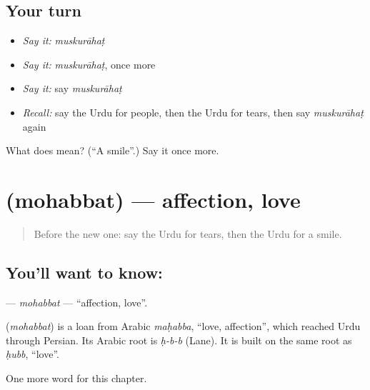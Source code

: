 \subsection*{Your turn}
\begin{itemize}
\raggedright
  \item \emph{Say it:} \emph{muskurāhaṭ}
  \item \emph{Say it:} \emph{muskurāhaṭ}, once more
  \item \emph{Say it:} say \emph{muskurāhaṭ}
  \item \emph{Recall:} say the Urdu for people, then the Urdu for tears, then say \emph{muskurāhaṭ} again
\end{itemize}

\begin{tcolorbox}[breakable,colback=teal!4,colframe=teal!35!black,title={Before you move on}]
What does  mean? (\textquotedblleft{}A smile\textquotedblright{}.) Say it once more.
\end{tcolorbox}
\section[\texorpdfstring{\ur{محبت} (mohabbat)}{محبت (mohabbat)}]{ (mohabbat) — affection, love}

\label{lesson:UR-C257-mohabbat}



\begin{quote}
Before the new one: say the Urdu for tears, then the Urdu for a smile.
\end{quote}

\subsection*{You'll want to know: }
\textbf{} — \emph{mohabbat} — \textquotedblleft{}affection, love\textquotedblright{}.

\begin{cousinweb}
\textbf{} (\emph{mohabbat}) is a loan from Arabic \emph{maḥabba}, \textquotedblleft{}love, affection\textquotedblright{}, which reached Urdu through Persian. Its Arabic root is \emph{ḥ-b-b} (Lane). It is built on the same root as \emph{ḥubb}, \textquotedblleft{}love\textquotedblright{}.
\end{cousinweb}

\begin{grammarlens}[title={What you've built}]
One more word for this chapter.
\end{grammarlens}

